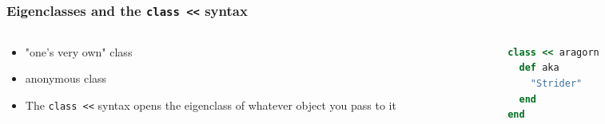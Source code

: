 \begin{frame}[fragile]\frametitle{Eigenclasses and the \texttt{class <<} syntax}

\begin{columns}[c] 

\begin{column}{5.5cm}

\begin{itemize}
\item "one's very own" class
\item anonymous class
\item<3-> The \texttt{class <<} syntax opens the eigenclass of whatever object you pass to it
\end{itemize}

\end{column}

\pause

\begin{column}{5.5cm}



\pause

\begin{lstlisting}[language=ruby, escapechar={^}]
class << aragorn
  def aka
    "Strider"
  end
end
\end{lstlisting}

\end{column}

\end{columns}

\end{frame}





